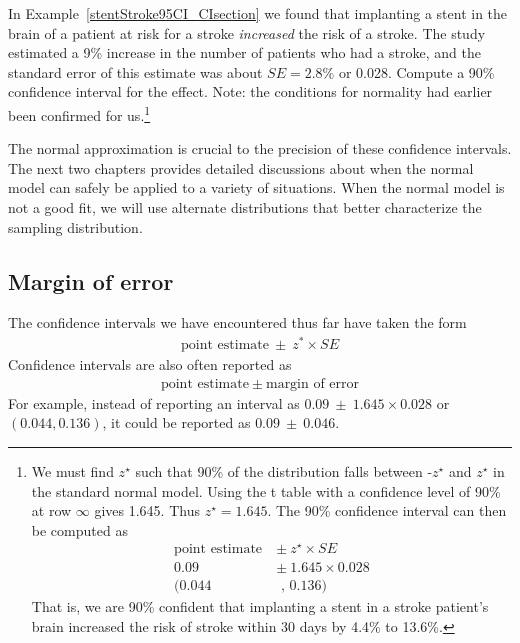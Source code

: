 \begin{exercise} \label{find90CIForRun10AgeExercise}
In Example~\ref{stentStroke95CI_CIsection} we found that implanting a stent in the brain of a patient at risk for a stroke \emph{increased} the risk of a stroke. The study estimated a 9\% increase in the number of patients who had a stroke, and the standard error of this estimate was about $SE = 2.8\%$ or 0.028. Compute a 90\% confidence interval for the effect. Note: the conditions for normality had earlier been confirmed for us.\footnote{We must find $z^{\star}$ such that 90\% of the distribution falls between -$z^{\star}$ and $z^{\star}$ in the standard normal model. Using the t table with a confidence level of 90\% at row $\infty$ gives 1.645. Thus $z^{\star}=1.645$. The 90\% confidence interval can then be computed as
\begin{align*}
\text{point estimate}\ &\pm\ z^{\star}\times SE \\
0.09 \ &\pm \ 1.645\times 0.028 \\
(0.044& \text{ , } 0.136)
\end{align*}
That is, we are 90\% confident that implanting a stent in a stroke patient's brain increased the risk of stroke within 30 days by 4.4\% to 13.6\%.}
\end{exercise}


The normal approximation is crucial to the precision of these confidence intervals. The next two chapters provides detailed discussions about when the normal model can safely be applied to a variety of situations. When the normal model is not a good fit, we will use alternate distributions that better characterize the sampling distribution.

\subsection{Margin of error}

The confidence intervals we have encountered thus far have taken the form
\begin{align*}
\text{point estimate} \ \pm \ z^*\times SE
\end{align*}
Confidence intervals are also often reported as 
\begin{align*}
\text{point estimate} \ \pm \ \text{margin of error}
\end{align*}
For example, instead of reporting an interval as $0.09 \ \pm  \ 1.645\times 0.028$ or $(0.044, 0.136)$, it could be reported as $0.09 \ \pm \  0.046$.

